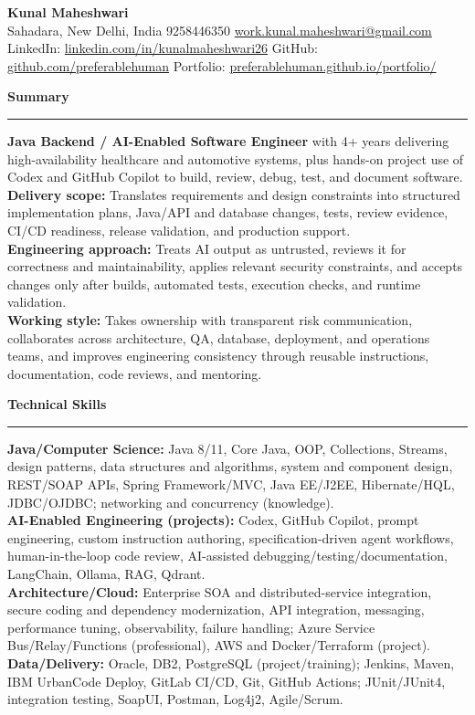 \documentclass[11pt,letterpaper]{article}
\newcommand{\ressection}[1]{\Needspace{6\baselineskip}\vspace{8pt}\par\textbf{#1}\par\vspace{2pt}\hrule\vspace{5pt}}
\begin{document}
\pagestyle{empty}\raggedright\fontsize{11}{12.5}\selectfont

{\Large \textbf{Kunal Maheshwari}}\\
Sahadara, New Delhi, India \textbar{} 9258446350 \textbar{} \href{mailto:work.kunal.maheshwari@gmail.com}{work.kunal.maheshwari@gmail.com}\\
LinkedIn: \href{https://www.linkedin.com/in/kunalmaheshwari26}{linkedin.com/in/kunalmaheshwari26} \textbar{} GitHub: \href{https://github.com/preferablehuman}{github.com/preferablehuman} \textbar{} Portfolio: \href{https://preferablehuman.github.io/portfolio/}{preferablehuman.github.io/portfolio/}

\ressection{Summary}
\textbf{Java Backend / AI-Enabled Software Engineer} with 4+ years delivering high-availability healthcare and automotive systems, plus hands-on project use of Codex and GitHub Copilot to build, review, debug, test, and document software.\\[2pt]
\textbf{Delivery scope:} Translates requirements and design constraints into structured implementation plans, Java/API and database changes, tests, review evidence, CI/CD readiness, release validation, and production support.\\[2pt]
\textbf{Engineering approach:} Treats AI output as untrusted, reviews it for correctness and maintainability, applies relevant security constraints, and accepts changes only after builds, automated tests, execution checks, and runtime validation.\\[2pt]
\textbf{Working style:} Takes ownership with transparent risk communication, collaborates across architecture, QA, database, deployment, and operations teams, and improves engineering consistency through reusable instructions, documentation, code reviews, and mentoring.

\ressection{Technical Skills}
\textbf{Java/Computer Science:} Java 8/11, Core Java, OOP, Collections, Streams, design patterns, data structures and algorithms, system and component design, REST/SOAP APIs, Spring Framework/MVC, Java EE/J2EE, Hibernate/HQL, JDBC/OJDBC; networking and concurrency (knowledge).\\
\textbf{AI-Enabled Engineering (projects):} Codex, GitHub Copilot, prompt engineering, custom instruction authoring, specification-driven agent workflows, human-in-the-loop code review, AI-assisted debugging/testing/documentation, LangChain, Ollama, RAG, Qdrant.\\
\textbf{Architecture/Cloud:} Enterprise SOA and distributed-service integration, secure coding and dependency modernization, API integration, messaging, performance tuning, observability, failure handling; Azure Service Bus/Relay/Functions (professional), AWS and Docker/Terraform (project).\\
\textbf{Data/Delivery:} Oracle, DB2, PostgreSQL (project/training); Jenkins, Maven, IBM UrbanCode Deploy, GitLab CI/CD, Git, GitHub Actions; JUnit/JUnit4, integration testing, SoapUI, Postman, Log4j2, Agile/Scrum.
\end{document}
